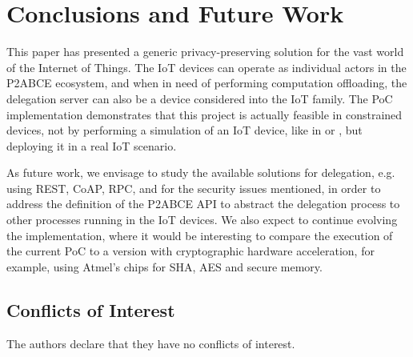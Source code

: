 \section{Conclusions and Future Work}\label{ch:conclusions}

This paper has presented a generic privacy-preserving solution for the vast world of the Internet of Things. The IoT devices can operate as individual actors in the P2ABCE ecosystem, and when in need of performing computation offloading, the delegation server can also be a device considered into the IoT family.
The PoC implementation demonstrates that this project is actually feasible in constrained devices, not by performing a simulation of an IoT device, like in \cite{vanet} or \cite{alcaide2013anonymous}, but deploying it in a real IoT scenario.

As future work, we envisage to study the available solutions for delegation, e.g. using REST, CoAP, RPC, and for the security issues mentioned, in order to address the definition of the P2ABCE API to abstract the delegation process to other processes running in the IoT devices. 
We also expect to continue evolving the implementation, where it would be interesting to compare the execution of the current PoC to a version with cryptographic hardware acceleration, for example, using Atmel's chips for SHA, AES and secure memory.


\subsection*{Conflicts of Interest}

The authors declare that they have no conflicts of interest.
